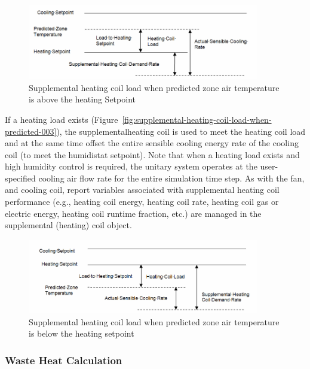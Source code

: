 \begin{figure}[hbtp] %
\centering
\includegraphics[width=0.9\textwidth, height=0.9\textheight, keepaspectratio=true]{media/image5015.png}
\caption{Supplemental heating coil load when predicted zone air temperature is above the heating Setpoint \protect \label{fig:supplemental-heating-coil-load-when-predicted}}
\end{figure}

If a heating load exists (Figure~\ref{fig:supplemental-heating-coil-load-when-predicted-003}), the supplementalheating coil is used to meet the heating coil load and at the same time offset the entire sensible cooling energy rate of the cooling coil (to meet the humidistat setpoint). Note that when a heating load exists and high humidity control is required, the unitary system operates at the user-specified cooling air flow rate for the entire simulation time step. As with the fan, and cooling coil, report variables associated with supplemental heating coil performance (e.g., heating coil energy, heating coil rate, heating coil gas or electric energy, heating coil runtime fraction, etc.) are managed in the supplemental (heating) coil object.

\begin{figure}[hbtp] %
\centering
\includegraphics[width=0.9\textwidth, height=0.9\textheight, keepaspectratio=true]{media/image5016.png}
\caption{Supplemental heating coil load when predicted zone air temperature is below the heating setpoint \protect \label{fig:supplemental-heating-coil-load-when-predicted-001}}
\end{figure}

\subsubsection{Waste Heat Calculation}\label{waste-heat-calculation}

